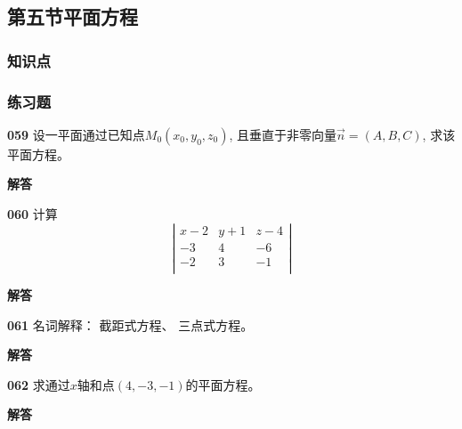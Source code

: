 \documentclass[a4paper,10pt]{article} %
\begin{document}


\textheight


\newpage
\subsection{第五节\quad 平面方程}
\subsubsection{知识点}
\subsubsection{练习题}
\par\noindent \textbf{059} \quad 设一平面通过已知点$M_0(x_0,y_0,z_0)$, 且垂直于非零向量$\vec{n}=(A,B,C)$,
求该平面方程。
\par\noindent \textbf{ 解答}





\textheight


\par\noindent \textbf{060} \quad 计算
$$
\left |\begin{array}{cccc}
x-2 & y+1  & z-4 \\
-3  & 4    & -6  \\
-2  & 3    & -1 \\
\end{array}\right|
$$
\par\noindent \textbf{ 解答}





\textheight


\par\noindent \textbf{061} \quad 名词解释： 截距式方程、 三点式方程。
\par\noindent \textbf{ 解答}





\textheight


\par\noindent \textbf{062} \quad 求通过$x$轴和点$(4,-3,-1)$的平面方程。
\par\noindent \textbf{ 解答}
\end{document}
